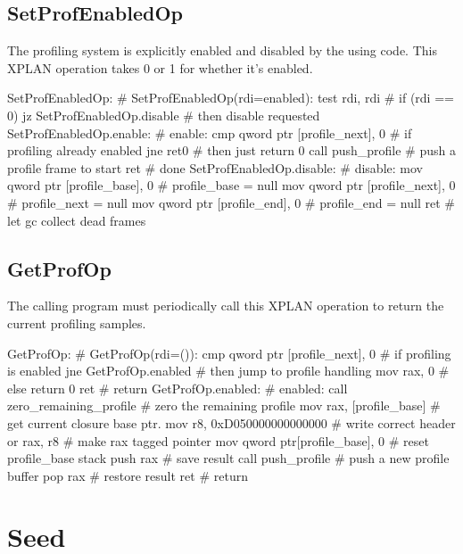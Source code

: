 \subsection{SetProfEnabledOp}

The profiling system is explicitly enabled and disabled by the using code. This
XPLAN operation takes 0 or 1 for whether it's enabled.

\begin{asm}
SetProfEnabledOp:			    # SetProfEnabledOp(rdi=enabled):
	test	rdi, rdi		    #   if (rdi == 0)
	jz	SetProfEnabledOp.disable    #   then disable requested
SetProfEnabledOp.enable:		    # enable:
	cmp	qword ptr [profile_next], 0 #   if profiling already enabled
	jne	ret0			    #   then just return 0
	call	push_profile		    #   push a profile frame to start
	ret				    #   done
SetProfEnabledOp.disable:		    # disable:
	mov	qword ptr [profile_base], 0 #   profile_base = null
	mov	qword ptr [profile_next], 0 #   profile_next = null
	mov	qword ptr [profile_end], 0  #   profile_end = null
	ret				    #   let gc collect dead frames
\end{asm}

\subsection{GetProfOp}

The calling program must periodically call this XPLAN operation to return the
current profiling samples.

\begin{asm}
GetProfOp:				    # GetProfOp(rdi=()):
	cmp	qword ptr [profile_next], 0 #   if profiling is enabled
	jne	GetProfOp.enabled	    #   then jump to profile handling
	mov	rax, 0			    #   else return 0
	ret				    #   return
GetProfOp.enabled:			    # enabled:
	call	zero_remaining_profile	    #   zero the remaining profile
	mov	rax, [profile_base]	    #   get current closure base ptr.
	mov	r8, 0xD050000000000000	    #   write correct header
	or	rax, r8			    #   make rax tagged pointer
	mov	qword ptr[profile_base], 0  #   reset profile_base stack
	push	rax			    #   save result
	call	push_profile		    #   push a new profile buffer
	pop	rax			    #   restore result
	ret				    #   return
\end{asm}


\section{Seed}

